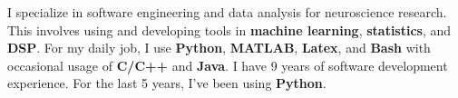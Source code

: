 \begin{cventries}
    \begin{flushleft}
        I specialize in software engineering and data analysis for neuroscience research. This involves using and developing tools in \textbf{machine learning}, \textbf{statistics}, and \textbf{DSP}.
        For my daily job, I use \textbf{Python}, \textbf{MATLAB}, \textbf{Latex}, and \textbf{Bash} with occasional usage of \textbf{C/C++} and \textbf{Java}. I have 9 years of software development experience. For the last 5 years, I've been using \textbf{Python}.
    \end{flushleft}
\end{cventries}
